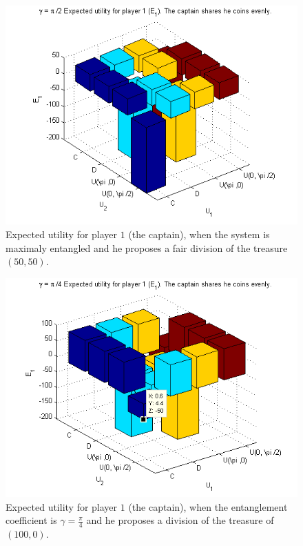 \begin{figure}[h!]
\centering 
\includegraphics[scale=0.60]{Figures/1.5qubit/poorcaptain.png}
\caption{Expected utility for player $1$ (the captain), when the system is maximaly entangled and he proposes a fair division of the treasure $(50,50)$.}
\label{fig:pg_2players_99_0_1:33}
\end{figure}


\begin{figure}[h!]
\centering 
\includegraphics[scale=0.60]{Figures/1.5qubit/piadividirpor4.png}
\caption{Expected utility for player $1$ (the captain), when the entanglement coefficient is $\gamma=\frac{\pi}{4}$ and he proposes a division of the treasure of $(100,0)$.}
\label{fig:pg_2players_99_0_1:33jesus}
\end{figure}


